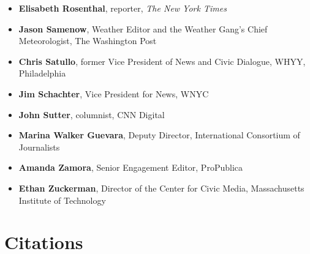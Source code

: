 \documentclass[notoc, symmetric, nobib, nols]{towcenter-guideto-book}
\newcommand{\blankpage}{\newpage\hbox{}\thispagestyle{empty}\newpage}
\begin{document}
\begin{itemize}
\item \textbf{Elisabeth Rosenthal}, reporter, \textit{The New York Times}
\item \textbf{Jason Samenow}, Weather Editor and the Weather Gang's Chief Meteorologist, The Washington Post
\item \textbf{Chris Satullo}, former Vice President of News and Civic Dialogue, WHYY, Philadelphia
\item \textbf{Jim Schachter}, Vice President for News, WNYC
\item \textbf{John Sutter}, columnist, CNN Digital
\item \textbf{Marina Walker Guevara}, Deputy Director, International Consortium of Journalists
\item \textbf{Amanda Zamora}, Senior Engagement Editor, ProPublica
\item \textbf{Ethan Zuckerman}, Director of the Center for Civic Media, Massachusetts Institute of Technology
\end{itemize}

\chapter{Citations}
\blankpage
\theendnotes
\end{document}
